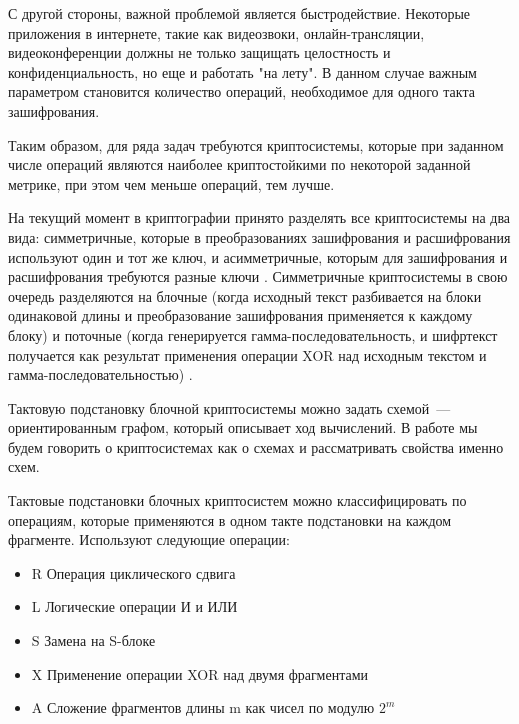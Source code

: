 \documentclass[a4paper,12pt]{report}
\theoremstyle{plain} %
\theoremstyle{definition}
\theoremstyle{remark}
\begin{document}
\begin{large}
С другой стороны, важной проблемой является быстродействие. Некоторые приложения в интернете, такие как видеозвоки, онлайн-трансляции, видеоконференции должны не только защищать целостность и конфиденциальность, но еще и работать "на лету". В данном случае важным параметром становится количество операций, необходимое для одного такта зашифрования.

Таким образом, для ряда задач требуются криптосистемы, которые при заданном числе операций являются наиболее криптостойкими по некоторой заданной метрике, при этом чем меньше операций, тем лучше.

На текущий момент в криптографии принято разделять все криптосистемы на два вида: симметричные, которые в преобразованиях зашифрования и расшифрования используют один и тот же ключ, и асимметричные, которым для зашифрования и расшифрования требуются разные ключи \cite{brassar}. Симметричные криптосистемы в свою очередь разделяются на блочные (когда исходный текст разбивается на блоки одинаковой длины и преобразование зашифрования применяется к каждому блоку) и поточные (когда генерируется гамма-последовательность, и шифртекст получается как результат применения операции XOR над исходным текстом и гамма-последовательностью) \cite{alferov}. 

Тактовую подстановку блочной криптосистемы можно задать схемой~---
ориентированным графом, который описывает ход вычислений. В работе мы будем говорить о криптосистемах как о схемах и рассматривать свойства именно схем.

Тактовые подстановки блочных криптосистем можно классифицировать по операциям, которые применяются в одном такте подстановки на каждом фрагменте. Используют следующие операции:

\begin{itemize}
\item R
\newline Операция циклического сдвига
\item L
\newline Логические операции И и ИЛИ
\item S
\newline Замена на S-блоке
\item X
\newline Применение операции XOR над двумя фрагментами
\item A
\newline Сложение фрагментов длины m как чисел по модулю $2^m$
\end{itemize}


\end{large}
\end{document}
